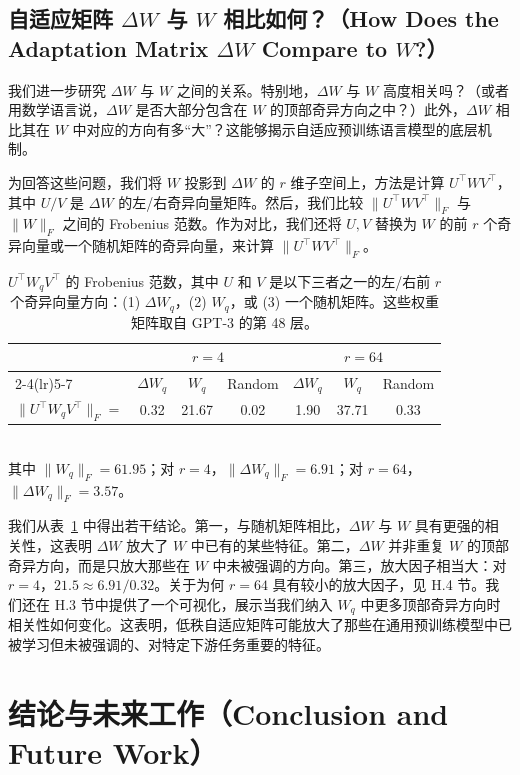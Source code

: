 \documentclass[11pt,UTF8,fontset=fandol]{ctexart}
\begin{document}
\subsection{自适应矩阵 $\Delta W$ 与 $W$ 相比如何？（How Does the Adaptation Matrix $\Delta W$ Compare to $W$?）}

我们进一步研究 $\Delta W$ 与 $W$ 之间的关系。特别地，$\Delta W$ 与 $W$ 高度相关吗？（或者用数学语言说，$\Delta W$ 是否大部分包含在 $W$ 的顶部奇异方向之中？）此外，$\Delta W$ 相比其在 $W$ 中对应的方向有多“大”？这能够揭示自适应预训练语言模型的底层机制。

为回答这些问题，我们将 $W$ 投影到 $\Delta W$ 的 $r$ 维子空间上，方法是计算 $U^\top W V^\top$，其中 $U/V$ 是 $\Delta W$ 的左/右奇异向量矩阵。然后，我们比较 $\|U^\top W V^\top\|_F$ 与 $\|W\|_F$ 之间的 Frobenius 范数。作为对比，我们还将 $U, V$ 替换为 $W$ 的前 $r$ 个奇异向量或一个随机矩阵的奇异向量，来计算 $\|U^\top W V^\top\|_F$。

\begin{table}[H]\centering
\caption{$U^\top W_q V^\top$ 的 Frobenius 范数，其中 $U$ 和 $V$ 是以下三者之一的左/右前 $r$ 个奇异向量方向：(1) $\Delta W_q$，(2) $W_q$，或 (3) 一个随机矩阵。这些权重矩阵取自 GPT-3 的第 48 层。}
\label{tab:7}
\begin{tabular}{lcccccc}
\toprule
 & \multicolumn{3}{c}{$r=4$} & \multicolumn{3}{c}{$r=64$} \\
\cmidrule(lr){2-4}\cmidrule(lr){5-7}
 & $\Delta W_q$ & $W_q$ & Random & $\Delta W_q$ & $W_q$ & Random \\
\midrule
$\|U^\top W_q V^\top\|_F=$ & 0.32 & 21.67 & 0.02 & 1.90 & 37.71 & 0.33 \\
\bottomrule
\end{tabular}\\[0.4em]
\small 其中 $\|W_q\|_F=61.95$；对 $r=4$，$\|\Delta W_q\|_F=6.91$；对 $r=64$，$\|\Delta W_q\|_F=3.57$。
\end{table}

我们从表~\ref{tab:7} 中得出若干结论。第一，与随机矩阵相比，$\Delta W$ 与 $W$ 具有更强的相关性，这表明 $\Delta W$ 放大了 $W$ 中已有的某些特征。第二，$\Delta W$ 并非重复 $W$ 的顶部奇异方向，而是只放大那些在 $W$ 中未被强调的方向。第三，放大因子相当大：对 $r=4$，$21.5\approx 6.91/0.32$。关于为何 $r=64$ 具有较小的放大因子，见 H.4 节。我们还在 H.3 节中提供了一个可视化，展示当我们纳入 $W_q$ 中更多顶部奇异方向时相关性如何变化。这表明，低秩自适应矩阵可能放大了那些在通用预训练模型中已被学习但未被强调的、对特定下游任务重要的特征。

\section{结论与未来工作（Conclusion and Future Work）}
\end{document}
